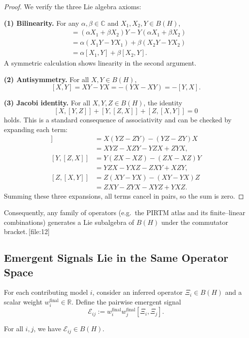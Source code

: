 \documentclass[11pt]{article}
\begin{document}
\begin{proof}
We verify the three Lie algebra axioms:

\textbf{(1) Bilinearity.}
For any \(\alpha,\beta \in \mathbb{C}\) and \(X_1,X_2,Y \in B(H)\),
\begin{align*}
  [\alpha X_1 + \beta X_2, Y]
  &= (\alpha X_1 + \beta X_2)Y - Y(\alpha X_1 + \beta X_2) \\
  &= \alpha(X_1Y - YX_1) + \beta(X_2Y - YX_2) \\
  &= \alpha[X_1,Y] + \beta[X_2,Y].
\end{align*}
A symmetric calculation shows linearity in the second argument.

\textbf{(2) Antisymmetry.}
For all \(X,Y \in B(H)\),
\[
  [X,Y] = XY - YX = - (YX - XY) = -[Y,X].
\]

\textbf{(3) Jacobi identity.}
For all \(X,Y,Z \in B(H)\), the identity
\[
  [X,[Y,Z]] + [Y,[Z,X]] + [Z,[X,Y]] = 0
\]
holds. This is a standard consequence of associativity and can be checked by
expanding each term:
\begin{align*}
[X,[Y,Z]]
&= X(YZ - ZY) - (YZ - ZY)X \\
&= XYZ - XZY - YZX + ZYX,\\
[Y,[Z,X]]
&= Y(ZX - XZ) - (ZX - XZ)Y \\
&= YZX - YXZ - ZXY + XZY,\\
[Z,[X,Y]]
&= Z(XY - YX) - (XY - YX)Z \\
&= ZXY - ZYX - XYZ + YXZ.
\end{align*}
Summing these three expansions, all terms cancel in pairs, so the sum is
zero.
\end{proof}

Consequently, any family of operators (e.g.\ the PIRTM atlas and its
finite--linear combinations) generates a Lie subalgebra of \(B(H)\) under the
commutator bracket.\,[file:12]

\subsection{Emergent Signals Lie in the Same Operator Space}

For each contributing model \(i\), consider an inferred operator
\(\Xi_i \in B(H)\) and a scalar weight \(w_i^{\mathrm{final}} \in \mathbb{R}\).
Define the pairwise emergent signal
\[
  \mathcal{E}_{ij} := w_i^{\mathrm{final}} w_j^{\mathrm{final}} [\Xi_i,\Xi_j].
\]

\begin{lemma}
For all \(i,j\), we have \(\mathcal{E}_{ij} \in B(H)\).
\end{lemma}
\end{document}
